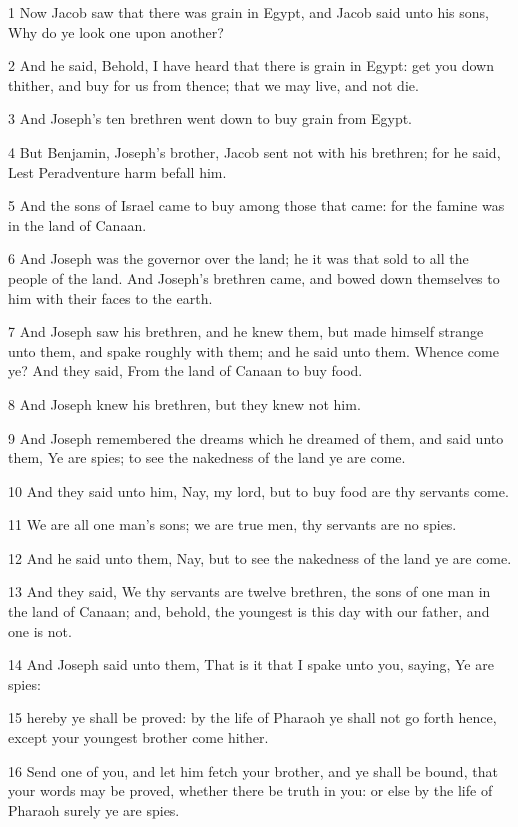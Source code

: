 \par 1 Now Jacob saw that there was grain in Egypt, and Jacob said unto his sons, Why do ye look one upon another?
\par 2 And he said, Behold, I have heard that there is grain in Egypt: get you down thither, and buy for us from thence; that we may live, and not die.
\par 3 And Joseph's ten brethren went down to buy grain from Egypt.
\par 4 But Benjamin, Joseph's brother, Jacob sent not with his brethren; for he said, Lest Peradventure harm befall him.
\par 5 And the sons of Israel came to buy among those that came: for the famine was in the land of Canaan.
\par 6 And Joseph was the governor over the land; he it was that sold to all the people of the land. And Joseph's brethren came, and bowed down themselves to him with their faces to the earth.
\par 7 And Joseph saw his brethren, and he knew them, but made himself strange unto them, and spake roughly with them; and he said unto them. Whence come ye? And they said, From the land of Canaan to buy food.
\par 8 And Joseph knew his brethren, but they knew not him.
\par 9 And Joseph remembered the dreams which he dreamed of them, and said unto them, Ye are spies; to see the nakedness of the land ye are come.
\par 10 And they said unto him, Nay, my lord, but to buy food are thy servants come.
\par 11 We are all one man's sons; we are true men, thy servants are no spies.
\par 12 And he said unto them, Nay, but to see the nakedness of the land ye are come.
\par 13 And they said, We thy servants are twelve brethren, the sons of one man in the land of Canaan; and, behold, the youngest is this day with our father, and one is not.
\par 14 And Joseph said unto them, That is it that I spake unto you, saying, Ye are spies:
\par 15 hereby ye shall be proved: by the life of Pharaoh ye shall not go forth hence, except your youngest brother come hither.
\par 16 Send one of you, and let him fetch your brother, and ye shall be bound, that your words may be proved, whether there be truth in you: or else by the life of Pharaoh surely ye are spies.
